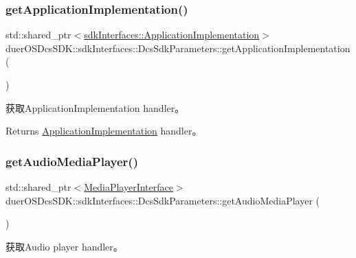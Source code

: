 \subsubsection{\texorpdfstring{get\+Application\+Implementation()}{getApplicationImplementation()}}
{\footnotesize\ttfamily std\+::shared\+\_\+ptr$<$\hyperlink{classduerOSDcsSDK_1_1sdkInterfaces_1_1ApplicationImplementation}{sdk\+Interfaces\+::\+Application\+Implementation}$>$ duer\+O\+S\+Dcs\+S\+D\+K\+::sdk\+Interfaces\+::\+Dcs\+Sdk\+Parameters\+::get\+Application\+Implementation (\begin{DoxyParamCaption}{ }\end{DoxyParamCaption})\hspace{0.3cm}{\ttfamily [inline]}}



获取\+Application\+Implementation handler。 

\begin{DoxyReturn}{Returns}
\hyperlink{classduerOSDcsSDK_1_1sdkInterfaces_1_1ApplicationImplementation}{Application\+Implementation} handler。 
\end{DoxyReturn}
\mbox{\label{structduerOSDcsSDK_1_1sdkInterfaces_1_1DcsSdkParameters_a778d9c0e35063af224264cb4c2d69b67}} 
\subsubsection{\texorpdfstring{get\+Audio\+Media\+Player()}{getAudioMediaPlayer()}}
{\footnotesize\ttfamily std\+::shared\+\_\+ptr$<$\hyperlink{classduerOSDcsSDK_1_1sdkInterfaces_1_1MediaPlayerInterface}{Media\+Player\+Interface}$>$ duer\+O\+S\+Dcs\+S\+D\+K\+::sdk\+Interfaces\+::\+Dcs\+Sdk\+Parameters\+::get\+Audio\+Media\+Player (\begin{DoxyParamCaption}{ }\end{DoxyParamCaption})\hspace{0.3cm}{\ttfamily [inline]}}



获取\+Audio player handler。 

